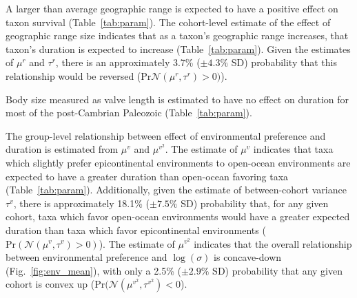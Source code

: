 \documentclass[11pt]{article}
\begin{document}
A larger than average geographic range is expected to have a positive effect on taxon survival (Table~\ref{tab:param}). The cohort-level estimate of the effect of geographic range size indicates that as a taxon's geographic range increases, that taxon's duration is expected to increase (Table~\ref{tab:param}). Given the estimates of \(\mu^{r}\) and \(\tau^{r}\), there is an approximately 3.7\% (\(\pm 4.3\%\) SD) probability that this relationship would be reversed (\(\mathrm{Pr}\mathcal{N}(\mu^{r}, \tau^{r}) > 0)\)). 

Body size measured as valve length is estimated to have no effect on duration for most of the post-Cambrian Paleozoic (Table~\ref{tab:param}).

The group-level relationship between effect of environmental preference and duration is estimated from \(\mu^{v}\) and \(\mu^{v^{2}}\). The estimate of \(\mu^{v}\) indicates that taxa which slightly prefer epicontinental environments to open-ocean environments are expected to have a greater duration than open-ocean favoring taxa (Table~\ref{tab:param}). Additionally, given the estimate of between-cohort variance \(\tau^{v}\), there is approximately 18.1\% (\(\pm 7.5\%\) SD) probability that, for any given cohort, taxa which favor open-ocean environments would have a greater expected duration than taxa which favor epicontinental environments (\(\mathrm{Pr}(\mathcal{N}(\mu^{v}, \tau^{v}) > 0)\)). The estimate of \(\mu^{v^{2}}\) indicates that the overall relationship between environmental preference and \(\log(\sigma)\) is concave-down (Fig.~\ref{fig:env_mean}), with only a 2.5\% (\(\pm 2.9\%\) SD) probability that any given cohort is convex up (\(\mathrm{Pr}(\mathcal{N}(\mu^{v^{2}}, \tau^{v^{2}}) < 0\)).
\end{document}

